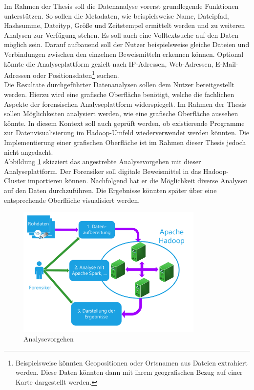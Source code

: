 \noindent
Im Rahmen der Thesis soll die Datenanalyse vorerst grundlegende Funktionen unterstützen.
So sollen die Metadaten, wie beispielsweise Name, Dateipfad, Hashsumme, Dateityp, Größe und Zeitstempel ermittelt werden und zu weiteren Analysen zur Verfügung stehen.
Es soll auch eine Volltextsuche auf den Daten möglich sein. Darauf aufbauend soll der Nutzer beispielsweise gleiche Dateien und Verbindungen zwischen den einzelnen Beweismitteln erkennen können.
Optional könnte die Analyseplattform gezielt nach IP-Adressen, Web-Adressen, E-Mail-Adressen oder Positionsdaten\footnote{Beispielsweise könnten Geopositionen oder Ortsnamen aus Dateien extrahiert werden. Diese Daten könnten dann mit ihrem geografischen Bezug auf einer Karte dargestellt werden.} suchen.\\

\noindent
Die Resultate durchgeführter Datenanalysen sollen dem Nutzer bereitgestellt werden. Hierzu
wird eine grafische Oberfläche benötigt, welche die fachlichen Aspekte der forensischen Analyseplattform widerspiegelt. Im Rahmen der Thesis sollen Möglichkeiten analysiert werden, wie eine grafische Oberfläche aussehen könnte. In diesem Kontext soll auch geprüft werden, ob existierende Programme zur Datenvisualisierung im Hadoop-Umfeld wiederverwendet werden könnten. Die Implementierung einer grafischen Oberfläche ist im Rahmen dieser Thesis jedoch nicht angedacht.\\

\noindent
Abbildung \ref{fig:foam_analysis_approach} skizziert das angestrebte Analysevorgehen mit dieser Analyseplattform. Der Forensiker soll digitale Beweismittel in das Hadoop-Cluster importieren können. Nachfolgend hat er die Möglichkeit diverse Analysen auf den Daten durchzuführen. Die Ergebnisse könnten später über eine entsprechende Oberfläche visualisiert werden.\\

\begin{figure}[ht]
  \centering
  \includegraphics[width=0.82\textwidth]{./resource/Hadoop-Struktur.pdf}
  \caption{Analysevorgehen}
  \label{fig:foam_analysis_approach}
\end{figure}

